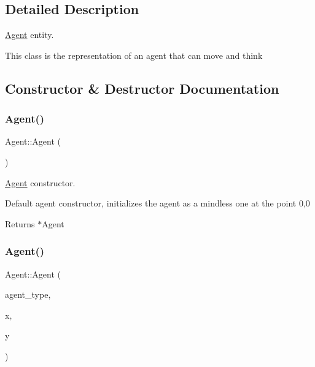 \subsection{Detailed Description}
\mbox{\hyperlink{class_agent}{Agent}} entity. 

This class is the representation of an agent that can move and think 

\subsection{Constructor \& Destructor Documentation}
\mbox{\label{class_agent_a24a60f1d260bf19a4f7f8a5f36881d3f}} 
\subsubsection{\texorpdfstring{Agent()}{Agent()}\hspace{0.1cm}{\footnotesize\ttfamily [1/2]}}
{\footnotesize\ttfamily Agent\+::\+Agent (\begin{DoxyParamCaption}{ }\end{DoxyParamCaption})}



\mbox{\hyperlink{class_agent}{Agent}} constructor. 

Default agent constructor, initializes the agent as a mindless one at the point 0,0

\begin{DoxyReturn}{Returns}
$\ast$\+Agent 
\end{DoxyReturn}
\mbox{\label{class_agent_a60d156a1030622542fd9d05d75f1a228}} 
\subsubsection{\texorpdfstring{Agent()}{Agent()}\hspace{0.1cm}{\footnotesize\ttfamily [2/2]}}
{\footnotesize\ttfamily Agent\+::\+Agent (\begin{DoxyParamCaption}\item[{const Agent\+Type}]{agent\+\_\+type,  }\item[{const float}]{x,  }\item[{const float}]{y }\end{DoxyParamCaption})}



